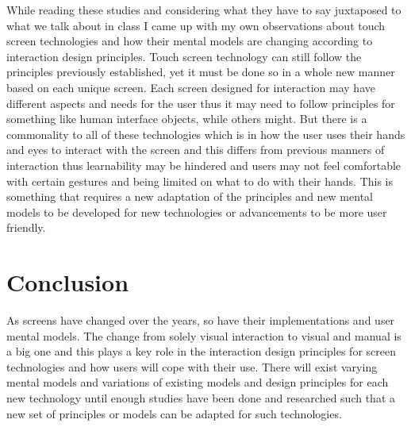 \documentclass[12pt]{article} %
\begin{document}
     While reading these studies and considering what they have to say juxtaposed to what we talk about in class I came up with my own observations about touch screen technologies and how their mental models are changing according to interaction design principles. Touch screen technology can still follow the principles previously established, yet it must be done so in a whole new manner based on each unique screen. Each screen designed for interaction may have different aspects and needs for the user thus it may need to follow principles for something like human interface objects, while others might. But there is a commonality to all of these technologies which is in how the user uses their hands and eyes to interact with the screen and this differs from previous manners of interaction thus learnability may be hindered and users may not feel comfortable with certain gestures and being limited on what to do with their hands.
This is something that requires a new adaptation of the principles and new mental models to be developed for new technologies or advancements to be more user friendly.
     
\section{Conclusion}

     As screens have changed over the years, so have their implementations and user mental models. The change from solely visual interaction to visual and manual is a big one and this plays a key role in the interaction design principles for screen technologies and how users will cope with their use. There will exist varying mental models and variations of existing models and design principles for each new technology until enough studies have been done and researched such that a new set of principles or models can be adapted for such technologies.


\end{document}
